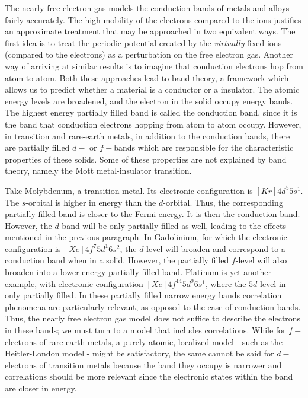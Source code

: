 \documentclass[10pt, twocolumn, twoside]{article}
\begin{document}
The nearly free electron gas models the conduction bands of metals and alloys fairly accurately. The high mobility of the electrons compared to the ions justifies an approximate treatment that may be approached in two equivalent ways. The first idea is to treat the periodic potential created by the \emph{virtually} fixed ions (compared to the electrons) as a perturbation on the free electron gas. Another way of arriving at similar results is to imagine that conduction electrons hop from atom to atom. Both these approaches lead to band theory, a framework which allows us to predict whether a material is a conductor or a insulator. The atomic energy levels are broadened, and the electron in the solid occupy energy bands. The highest energy partially filled band is called the conduction band, since it is the band that conduction electrons hopping from atom to atom occupy. However, in transition and rare-earth metals, in addition to the conduction bands, there are partially filled $d-$ or $f-$bands which are responsible for the characteristic properties of these solids. Some of these properties are not explained by band theory, namely the Mott metal-insulator transition.

Take Molybdenum, a transition metal. Its electronic configuration is $[Kr] 4d^5 5s^1$. The $s$-orbital is higher in energy than the $d$-orbital. Thus, the corresponding partially filled band is closer to the Fermi energy. It is then the conduction band. However, the $d$-band will be only partially filled as well, leading to the effects mentioned in the previous paragraph. In Gadolinium, for which the electronic configuration is $[Xe] 4f^7 5d^1 6s^2$, the $d$-level will broaden and correspond to a conduction band when in a solid. However, the partially filled $f$-level will also broaden into a lower energy partially filled band. Platinum is yet another example, with electronic configuration $[Xe]4f^{14} 5d^9 6s^1 $, where the $5d$ level in only partially filled. In these partially filled narrow energy bands correlation phenomena are particularly relevant, as opposed to the case of conduction bands. Thus, the nearly free electron gas model does not suffice to describe the electrons in these bands; we must turn to a model that includes correlations. While for $f-$electrons of rare earth metals, a purely atomic, localized model - such as the Heitler-London model - might be satisfactory, the same cannot be said for $d-$electrons of transition metals because the band they occupy is narrower and correlations should be more relevant since the electronic states within the band are closer in energy.
\end{document}

